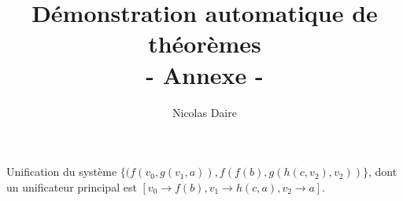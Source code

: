 \documentclass[a4paper]{article}
\title{Démonstration automatique de théorèmes\\- Annexe -}
\author{Nicolas Daire}
\date{}
\begin{document}
\newcommand{\treel}{.8}
\newcommand{\treeh}{0.6}
\newcommand{\treehh}{1.1}
\newcommand{\trees}{1}

\maketitle



















\newpage
Unification du système $\{(f(v_0,g(v_1,a)),f(f(b),g(h(c,v_2),v_2))\}$, dont un unificateur principal est $[v_0\rightarrow f(b),v_1\rightarrow h(c,a),v_2\rightarrow a]$.\\
\end{document}
